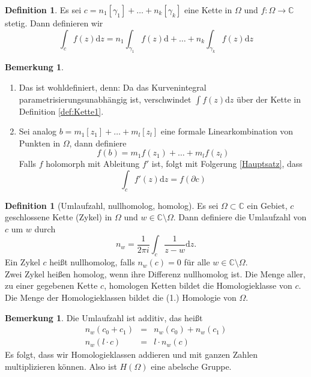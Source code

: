 \documentclass[11pt,titlepage]{article}
\theoremstyle{definition}
\newtheorem{definition}[theorem]{Definition}
\newtheorem{remark}[theorem]{Bemerkung}
\theoremstyle{remark}
\begin{document}
	\begin{definition}
		Es sei $c=n_1[\gamma_1]+\ldots+n_k[\gamma_k]$ eine Kette in $\Omega$ und 
		$f:\Omega\to\mathbb{C}$ stetig. Dann definieren wir
		\[ \int_c f(z)\mathrm{d}z =n_1 \int_{\gamma_1}f(z)\mathrm{d}+\ldots+
		n_k \int_{\gamma_k}f(z)\mathrm{d}z \]
	\end{definition}
	
	\begin{remark}
		\begin{enumerate}
			\item Das ist wohldefiniert, denn: Da das Kurvenintegral parametrisierungsunabhängig ist, 
			verschwindet $\int f(z)\mathrm{d}z$ über der Kette in Definition \ref{def:Kette1}.
			
			\item Sei analog $b=m_1[z_1]+\ldots+m_l[z_l]$ eine formale Linearkombination von 
			Punkten in $\Omega$, dann definiere
			\[ f(b)=m_1f(z_1)+\ldots+m_lf(z_l) \]
			Falls $f$ holomorph mit Ableitung $f'$ ist, folgt mit Folgerung \ref{Hauptsatz}, dass
			\[ \int_c f'(z)\mathrm{d}z=f(\partial c) \]
		\end{enumerate}
	\end{remark}
	
	\begin{definition}[Umlaufzahl, nullhomolog, homolog]
		Es sei $\Omega\subset\mathbb{C}$ ein Gebiet, $c$ geschlossene Kette (Zykel) in $\Omega$ 
		und $w\in\mathbb{C}\setminus\Omega$. Dann definiere die Umlaufzahl von $c$ um $w$ durch
		\[ n_w = \frac{1}{2\pi i} \int_c \frac{1}{z-w}\mathrm{d}z. \]
		Ein Zykel $c$ heißt nullhomolog, falls $n_w(c)=0$ für alle $w\in\mathbb{C}\setminus\Omega$. \\
		Zwei Zykel heißen homolog, wenn ihre Differenz nullhomolog ist. Die Menge aller, zu einer 
		gegebenen Kette $c$, homologen Ketten bildet die Homologieklasse von $c$. 
		Die Menge der Homologieklassen bildet die (1.) Homologie von $\Omega$.
	\end{definition}
	
	\begin{remark}
		Die Umlaufzahl ist additiv, das heißt
		\begin{eqnarray*}
			n_w(c_0+c_1)&=&n_w(c_0)+n_w(c_1) \\
			n_w(l\cdot c)&=&l\cdot n_w(c)
		\end{eqnarray*}
		Es folgt, dass wir Homologieklassen addieren und mit ganzen Zahlen multiplizieren können. 
		Also ist $H(\Omega)$ eine abelsche Gruppe.
	\end{remark}
	
\end{document}
